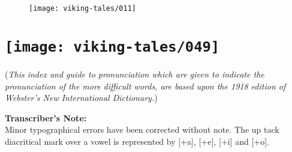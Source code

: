 \begin{figure}[hb]
    \centering
    \vskip8pt
    \texttt{[image: viking-tales/011]}
\end{figure}

\chapter[\itshape A Pronouncing Index]{
    \texttt{[image: viking-tales/049]}}

(\emph{This index and guide to pronunciation which are given to indicate
the pronunciation of the more difficult words, are based upon the 1918
edition of Webster's New International Dictionary.})

\noindent\textbf{Transcriber's Note:}\\
Minor typographical errors have been corrected without note. The up tack
diacritical mark over a vowel is represented by [+a], [+e], [+i] and
[+o].

